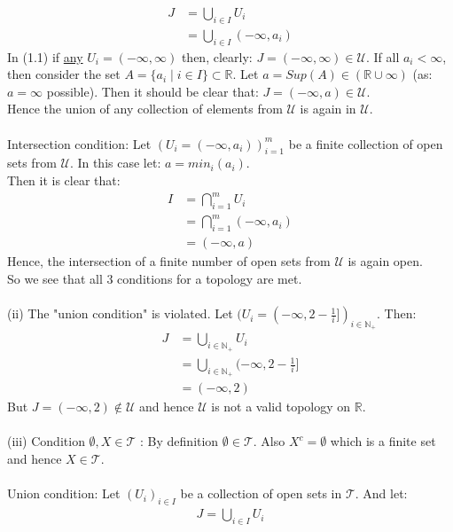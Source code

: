 \documentclass[12pt]{article}
\begin{document}
\begin{align*}
 J &= \bigcup_{i \in I} U_i \\
 &= \bigcup_{i \in I} (-\infty, a_i) \tag{1.1}
\end{align*}
In (1.1) if \underline{any} $U_i = (-\infty, \infty)$ then, clearly: $J=(-\infty, \infty) \in \mathcal{U}$. If all $a_i < \infty$, then consider
the set $A=\{a_i\;|\;i \in I\} \subset \mathbb{R}$.  Let $a = Sup(A) \in (\mathbb{R} \cup \infty)$ (as: $a=\infty$ possible). Then it should be clear that: $J=(-\infty, a) \in \mathcal{U}$.\\
Hence the union of any collection of elements from $\mathcal{U}$ is again in $\mathcal{U}$.\\
\\
Intersection condition: Let $(U_i = (-\infty, a_i))_{i=1}^m$ be a finite collection of open sets from $\mathcal{U}$.  In this case let: $a=min_i(a_i)$.\\
Then it is clear that:
\begin{align*}
 I &= \bigcap_{i=1}^m U_i \\
 &= \bigcap_{i=1}^m (-\infty, a_i) \\
 &= (-\infty, a)
\end{align*}
Hence, the intersection of a finite number of open sets from $\mathcal{U}$ is again open.\\
So we see that all 3 conditions for a topology are met.\\
\\
(ii) The "union condition" is violated.  Let $(U_i = (-\infty, 2-\frac{1}{i}])_{i \in \mathbb{N}_+}$.  Then:
\begin{align*}
 J &= \bigcup_{i \in \mathbb{N}_+} U_i \\
 &= \bigcup_{i \in \mathbb{N}_+} (-\infty, 2-\frac{1}{i}] \\
 &= (-\infty, 2)
\end{align*}
But $J = (-\infty, 2) \notin \mathcal{U}$ and hence $\mathcal{U}$ is not a valid topology on $\mathbb{R}$.\\
\\
(iii) Condition $\emptyset, X \in \mathcal{T}$ :  By definition $\emptyset \in \mathcal{T}$.  Also $X^c = \emptyset$ which is a finite
set and hence $X \in \mathcal{T}$. \\
\\
Union condition: Let $(U_i)_{i \in I}$ be a collection of open sets in $\mathcal{T}$.  And let:
\begin{align*}
J = \bigcup_{i \in I} U_i
\end{align*}
\end{document}
